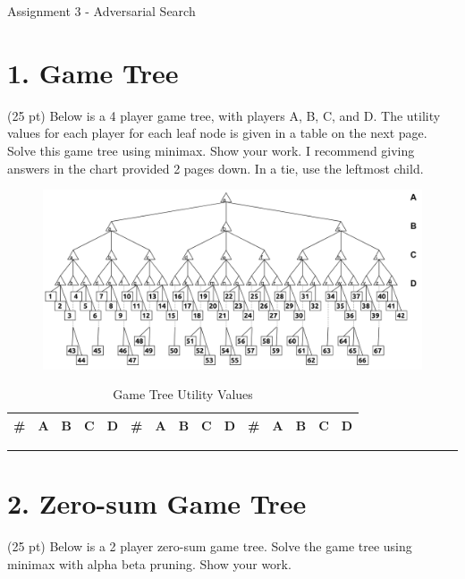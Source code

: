 \documentclass[11pt]{article}
\begin{document}
\begin{flushleft}
Assignment 3 - Adversarial Search

\section*{1. Game Tree}
(25 pt) Below is a 4 player game tree, with players A, B, C, and D. The utility
    values for each player for each leaf node is given in a table on the next
    page. Solve this game tree using minimax. Show your work. I recommend
    giving answers in the chart provided 2 pages down. In a tie, use the
    leftmost child.

\begin{figure}[h]
    \begin{center}
        \includegraphics[width=\textwidth]{Images/game_tree.png}
        \label{fig:game_tree}
    \end{center}
\end{figure}

 \begin{table}[h]
     \renewcommand{\arraystretch}{1.5}
     \begin{tabularx}{\textwidth}{| X | X | X | X | X | X | X | X | X | X | X | X | X | X | X |}
         \hline
         \textbf{\#} & \textbf{A} & \textbf{B} & \textbf{C} & \textbf{D} & \textbf{\#} & \textbf{A} & \textbf{B} & \textbf{C} & \textbf{D} & \textbf{\#} & \textbf{A} & \textbf{B} & \textbf{C} & \textbf{D} \\
         \hline
     \end{tabularx}
     \caption{\label{tab:game_tree_utility_values}Game Tree Utility Values}
 \end{table}


\rule{\textwidth}{0.5pt}

\section*{2. Zero-sum Game Tree}
(25 pt) Below is a 2 player zero-sum game tree. Solve the game tree using
    minimax with alpha beta pruning. Show your work.


\end{flushleft}
\end{document}
